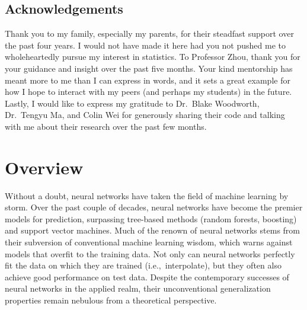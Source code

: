 \documentclass{article}
\begin{document}
\begin{centering}
\section*{Acknowledgements}
Thank you to my family, especially my parents, for their steadfast support over the past four years. I would not have made it here had you not pushed me to wholeheartedly pursue my interest in statistics. To Professor Zhou, thank you for your guidance and insight over the past five months. Your kind mentorship has meant more to me than I can express in words, and it sets a great example for how I hope to interact with my peers (and perhaps my students) in the future. Lastly, I would like to express my gratitude to Dr.~Blake Woodworth, Dr.~Tengyu Ma, and Colin Wei for generously sharing their code and talking with me about their research over the past few months.
\end{centering}

\vspace*{\fill}

\pagebreak


\vspace*{\fill}

\begin{centering}
\tableofcontents
\end{centering}

\vspace*{\fill}

\pagebreak

\section{Overview}
Without a doubt, neural networks have taken the field of machine learning by storm. Over the past couple of decades, neural networks have become the premier models for prediction, surpassing tree-based methods (random forests, boosting) and support vector machines. Much of the renown of neural networks stems from their subversion of conventional machine learning wisdom, which warns against models that overfit to the training data. Not only can neural networks perfectly fit the data on which they are trained (i.e.,~interpolate), but they often also achieve good performance on test data. Despite the contemporary successes of neural networks in the applied realm, their unconventional generalization properties remain nebulous from a theoretical perspective.
\end{document}
